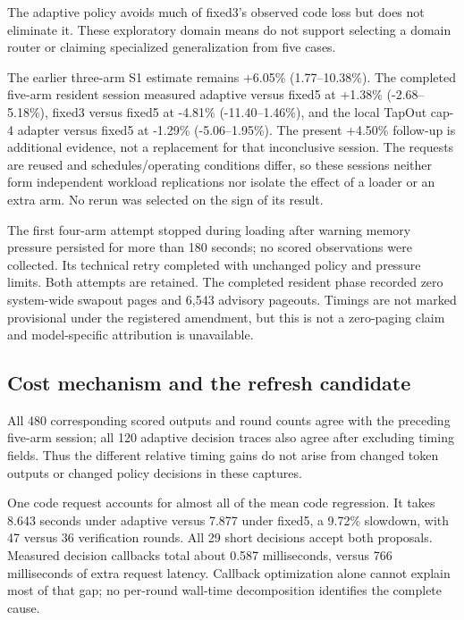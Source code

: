 \documentclass[
  11pt,
]{article}
\begin{document}
The adaptive policy avoids much of fixed3's observed code loss but does
not eliminate it. These exploratory domain means do not support
selecting a domain router or claiming specialized generalization from
five cases.

The earlier three-arm S1 estimate remains +6.05\% (1.77--10.38\%). The
completed five-arm resident session measured adaptive versus fixed5 at
+1.38\% (-2.68--5.18\%), fixed3 versus fixed5 at -4.81\%
(-11.40--1.46\%), and the local TapOut cap-4 adapter versus fixed5 at
-1.29\% (-5.06--1.95\%). The present +4.50\% follow-up is additional
evidence, not a replacement for that inconclusive session. The requests
are reused and schedules/operating conditions differ, so these sessions
neither form independent workload replications nor isolate the effect of
a loader or an extra arm. No rerun was selected on the sign of its
result.

The first four-arm attempt stopped during loading after warning memory
pressure persisted for more than 180 seconds; no scored observations
were collected. Its technical retry completed with unchanged policy and
pressure limits. Both attempts are retained. The completed resident
phase recorded zero system-wide swapout pages and 6,543 advisory
pageouts. Timings are not marked provisional under the registered
amendment, but this is not a zero-paging claim and model-specific
attribution is unavailable.

\subsection{Cost mechanism and the refresh
candidate}\label{cost-mechanism-and-the-refresh-candidate}

All 480 corresponding scored outputs and round counts agree with the
preceding five-arm session; all 120 adaptive decision traces also agree
after excluding timing fields. Thus the different relative timing gains
do not arise from changed token outputs or changed policy decisions in
these captures.

One code request accounts for almost all of the mean code regression. It
takes 8.643 seconds under adaptive versus 7.877 under fixed5, a 9.72\%
slowdown, with 47 versus 36 verification rounds. All 29 short decisions
accept both proposals. Measured decision callbacks total about 0.587
milliseconds, versus 766 milliseconds of extra request latency. Callback
optimization alone cannot explain most of that gap; no per-round
wall-time decomposition identifies the complete cause.
\end{document}
